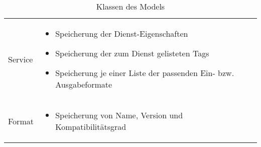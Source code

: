 \begin{table}[h]
\begin{tabularx}{\textwidth}{p{} | X}
		Service & \begin{itemize}
			\item Speicherung der Dienst-Eigenschaften
			\item Speicherung der zum Dienst gelisteten Tags
			\item Speicherung je einer Liste der passenden Ein- bzw. Ausgabeformate
		\end{itemize} \\
		\rowcolor[HTML]{E7E7E7}
		Format & \begin{itemize}
			\item Speicherung von Name, Version und Kompatibilitätsgrad
		\end{itemize} \\
	\end{tabularx}
	\caption{Klassen des Models}
	\label{table:klassenbeschreibung-a}
\end{table}

